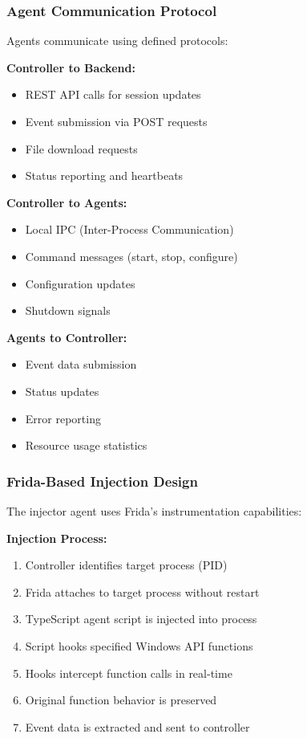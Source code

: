 \subsubsection{Agent Communication Protocol}

Agents communicate using defined protocols:

\textbf{Controller to Backend:}
\begin{itemize}
    \item REST API calls for session updates
    \item Event submission via POST requests
    \item File download requests
    \item Status reporting and heartbeats
\end{itemize}

\textbf{Controller to Agents:}
\begin{itemize}
    \item Local IPC (Inter-Process Communication)
    \item Command messages (start, stop, configure)
    \item Configuration updates
    \item Shutdown signals
\end{itemize}

\textbf{Agents to Controller:}
\begin{itemize}
    \item Event data submission
    \item Status updates
    \item Error reporting
    \item Resource usage statistics
\end{itemize}

\subsubsection{Frida-Based Injection Design}

The injector agent uses Frida's instrumentation capabilities:

\textbf{Injection Process:}
\begin{enumerate}
    \item Controller identifies target process (PID)
    \item Frida attaches to target process without restart
    \item TypeScript agent script is injected into process
    \item Script hooks specified Windows API functions
    \item Hooks intercept function calls in real-time
    \item Original function behavior is preserved
    \item Event data is extracted and sent to controller
\end{enumerate}

